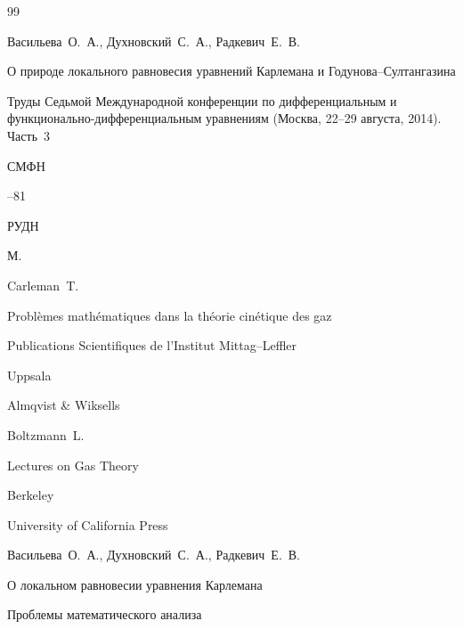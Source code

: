 \begin{thebibliography}{99}




\by Васильева~О.~А., Духновский~С.~А., Радкевич~Е.~В.

\paper О природе локального равновесия уравнений Карлемана и Годунова--Султангазина

\inbook Труды Седьмой Международной конференции по дифференциальным и функционально-дифференциальным уравнениям \rm (Москва, 22--29 августа, 2014). Часть~3

\serial СМФН



--81

\publ РУДН

\publaddr М.





\by Carleman~T.

\book Problèmes mathématiques dans la théorie cin\'etique des gaz


\serial Publications Scientifiques de l’Institut Mittag--Leffler


\publaddr Uppsala

\publ Almqvist \& Wiksells 






\by Boltzmann~L.

\book Lectures on Gas Theory

\publaddr Berkeley

\publ University of California Press








\by Васильева~О.~А., Духновский~С.~А., Радкевич~Е.~В.

\paper О локальном равновесии уравнения Карлемана

\jour Проблемы математического анализа


\end{thebibliography}
